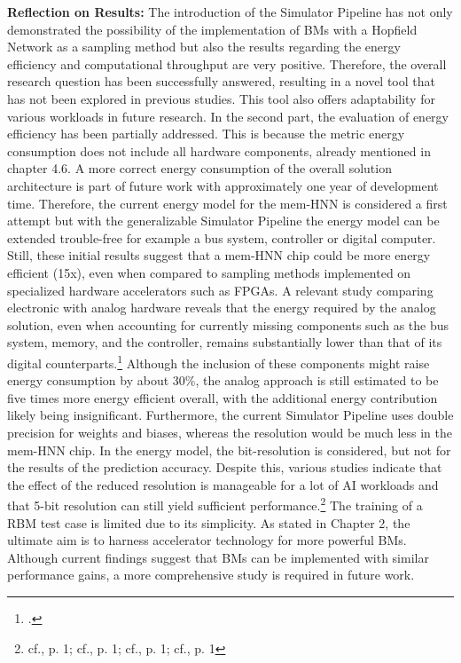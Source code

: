\textbf{Reflection on Results:} The introduction of the Simulator Pipeline has not only demonstrated the possibility 
of the implementation of \ac{BM}s with a Hopfield Network as a sampling method but also the results regarding
the energy efficiency and computational throughput are very positive.
Therefore, the overall research question has been successfully answered, resulting in a novel tool that has not been explored in previous studies.
This tool also offers adaptability for various workloads in future research.
In the second part, the evaluation of energy efficiency has been partially addressed.
This is because the metric energy consumption does not include all hardware components, already mentioned in chapter 4.6.
A more correct energy consumption of the overall solution architecture is part of future work with approximately one year of development time.
Therefore, the current energy model for the \ac{mem-HNN} is considered a first attempt but with the generalizable Simulator Pipeline
the energy model can be extended trouble-free for example a bus system, controller or digital computer.
Still, these initial results suggest that a \ac{mem-HNN} chip could be more energy efficient (15x), even when compared to sampling methods implemented on specialized hardware accelerators such as \ac{FPGA}s.
A relevant study comparing electronic with analog hardware reveals that the energy required by the analog solution, even when accounting for currently missing components such as the bus system, memory, and the controller, remains substantially lower than that of its digital counterparts.\footcite[cf.][12-13]{demirkiranElectroPhotonicSystemAccelerating2023}
Although the inclusion of these components might raise energy consumption by about 30\%, the analog approach is still estimated to be five times more energy efficient overall, with the additional energy contribution likely being insignificant.
Furthermore, the current Simulator Pipeline uses double precision for weights and biases, whereas the resolution would be much less in the \ac{mem-HNN} chip.
In the energy model, the bit-resolution is considered, but not for the results of the prediction accuracy. 
Despite this, various studies indicate that the effect of the reduced resolution is manageable for a lot of AI workloads and that 5-bit resolution can still yield sufficient performance.\footnote{cf.\cite{maEra1bitLLMs2024}, p. 1; cf.\cite{GitHubHtqinQuantSR}, p. 1; cf.\cite{rouhaniMicroscalingDataFormats2023}, p. 1; cf.\cite{rouhaniSharedMicroexponentsLittle2023}, p. 1}
The training of a \ac{RBM} test case is limited due to its simplicity.
As stated in Chapter 2, the ultimate aim is to harness accelerator technology for more powerful \ac{BM}s.
Although current findings suggest that \ac{BM}s can be implemented with similar performance gains, a more comprehensive study is required in future work.

